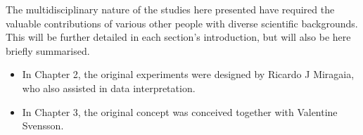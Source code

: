 
\begin{contributions}

The multidisciplinary nature of the studies here presented have required the valuable contributions of various other people with diverse scientific backgrounds. This will be further detailed in each section's introduction, but will also be here briefly summarised.

\begin{itemize}
\item In Chapter 2, the original experiments were designed by Ricardo J Miragaia, who also assisted in data interpretation.
\item In Chapter 3, the original concept was conceived together with Valentine Svensson.
\end{itemize}


\end{contributions}